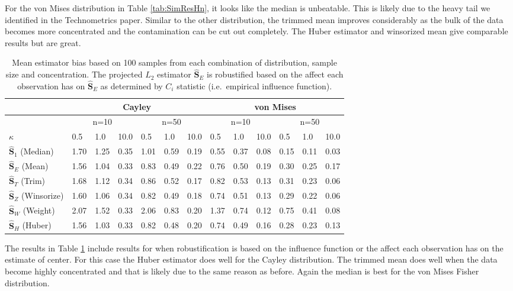 \documentclass{article}\usepackage[]{graphicx}\usepackage[]{color}
\newcommand{\ProjMean}{{\widehat{\bm S}_{E}}}
\newcommand{\ProjMedian}{{\widehat{\bm S}_{1}}}
\newcommand{\HuberMean}{{\widehat{\bm S}_H}}
\newcommand{\WeightMean}{{\widehat{\bm S}_W}}
\newcommand{\TrimMean}{{\widehat{\bm S}_T}}
\newcommand{\WinzMean}{{\widehat{\bm S}_Z}}
\newcommand{\red}[1]{{\color{red} #1}}
\begin{document}
For the von Mises distribution in Table \ref{tab:SimResHn}, it looks like the median is unbeatable.  This is likely due to the heavy tail we identified in the Technometrics paper.  Similar to the other distribution, the trimmed mean improves considerably as the bulk of the data becomes more concentrated and the contamination can be cut out completely.  The Huber estimator and winsorized mean give comparable results but are great.

\begin{table}[ht]
\centering
\begin{tabular}{l|lll|lll|lll|lll}
  \hline
 & \multicolumn{6}{|c|}{Cayley} & \multicolumn{6}{|c}{von Mises}   \\ 
\hline
   &  \multicolumn{3}{|c|}{n=10} & \multicolumn{3}{|c|}{n=50} & \multicolumn{3}{|c|}{n=10} & \multicolumn{3}{|c}{n=50} \\
  $\kappa$ &  0.5 &  1.0 & 10.0 &  0.5 &  1.0 & 10.0 &  0.5 &  1.0 & 10.0 &  0.5 &  1.0 & 10.0 \\ \hline
  $\ProjMedian$ (Median) & 1.70 & 1.25 & 0.35 & 1.01 & 0.59 & 0.19 & \red{ 0.55} & \red{ 0.37}& \red{ 0.08} & \red{ 0.15} & \red{ 0.11} & \red{ 0.03} \\ 
  $\ProjMean$ (Mean) & \red{ 1.56} & 1.04 & \red{ 0.33} & 0.83 & 0.49 & 0.22 & 0.76 & 0.50 & 0.19 & 0.30 & 0.25 & 0.17 \\ 
   $\TrimMean$ (Trim) & 1.68 & 1.12 & 0.34 & 0.86 & 0.52 & \red{ 0.17} & 0.82 & 0.53 & 0.13 & 0.31 & 0.23 & 0.06 \\ 
  $\WinzMean$ (Winsorize) & 1.60 & 1.06 & 0.34 & \red{ 0.82} & 0.49 & 0.18 & 0.74 & 0.51 & 0.13 & 0.29 & 0.22 & 0.06 \\ 
  $\WeightMean$ (Weight) & 2.07 & 1.52 & \red{ 0.33} & 2.06 & 0.83 & 0.20 & 1.37 & 0.74 & 0.12 & 0.75 & 0.41 & 0.08 \\ 
  $\HuberMean$ (Huber) & \red{ 1.56 }& \red{ 1.03} & \red{ 0.33} & \red{ 0.82} & \red{ 0.48} & 0.20 & 0.74 & 0.49 & 0.16 & 0.28 & 0.23 & 0.13 \\ 
   \hline
\end{tabular}
\caption{Mean estimator bias based on 100 samples from each combination of distribution, sample size and concentration.  The projected $L_2$ estimator $\ProjMean$ is robustified based on the affect each observation has on $\ProjMean$ as determined by $C_i$ statistic (i.e.~empirical influence function).}
\label{tab:SimResC}
\end{table}

The results in Table \ref{tab:SimResC} include results for when robustification is based on the influence function or the affect each observation has on the estimate of center.  For this case the Huber estimator does well for the Cayley distribution.  The trimmed mean does well when the data become highly concentrated and that is likely due to the same reason as before.  Again the median is best for the von Mises Fisher distribution.  
\end{document}
